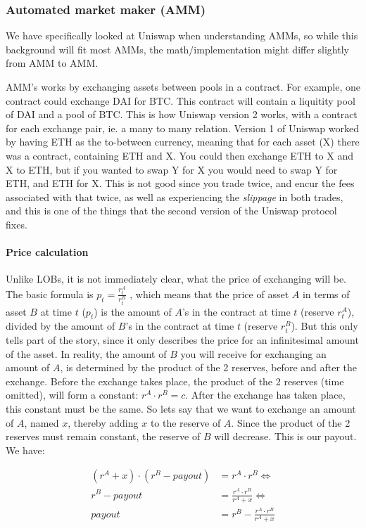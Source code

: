 \subsubsection{Automated market maker (AMM)}
We have specifically looked at Uniswap when understanding AMMs, so while this
background will fit most AMMs, the math/implementation might differ slightly
from AMM to AMM.

AMM's works by exchanging assets between pools in a contract. For example, one
contract could exchange DAI for BTC. This contract will contain a liquitity pool
of DAI and a pool of BTC. This is how Uniswap version 2 works, with a contract
for each exchange pair, ie. a many to many relation. Version 1 of Uniswap worked
by having ETH as the to-between currency, meaning that for each asset (X) there
was a contract, containing ETH and X. You could then exchange ETH to X and X to
ETH, but if you wanted to swap Y for X you would need to swap Y for ETH, and ETH
for X. This is not good since you trade twice, and encur the fees associated
with that twice, as well as experiencing the \textit{slippage} in both trades,
and this is one of the things that the second version of the Uniswap protocol fixes.

\paragraph{Price calculation}
Unlike LOBs, it is not immediately clear, what the price of exchanging will be.
The basic formula is $p_t=\frac{r^A_t}{r^B_t}$ \cite[eq 1, page 2]{uniswap},
which means that the price of asset $A$ in terms of asset $B$ at time $t$
($p_t$) is the amount of $A$'s in the contract at time $t$ (reserve $r^A_t$),
divided by the amount of $B$'s in the contract at time $t$ (reserve $r^B_t$).
But this only tells part of the story, since it only describes the price for an
infinitesimal amount of the asset. In reality, the amount of $B$ you will receive
for exchanging an amount of $A$, is determined by the product of the 2 reserves,
before and after the exchange. Before the exchange takes place, the product of
the 2 reserves (time omitted), will form a constant: $r^A \cdot r^B = c$. After
the exchange has taken place, this constant must be the same. So lets say that
we want to exchange an amount of $A$, named $x$, thereby adding $x$ to the
reserve of $A$. Since the product of the 2 reserves must remain constant, the
reserve of $B$ will decrease. This is our payout. We have:

\begin{align*}
  (r^A + x) \cdot (r^B - payout) & = r^A \cdot r^B \Leftrightarrow                 \\
  r^B - payout                   & = \frac{r^A \cdot r^B}{r^A + x} \Leftrightarrow \\
  payout                         & = r^B - \frac{r^A \cdot r^B}{r^A + x}
\end{align*}

